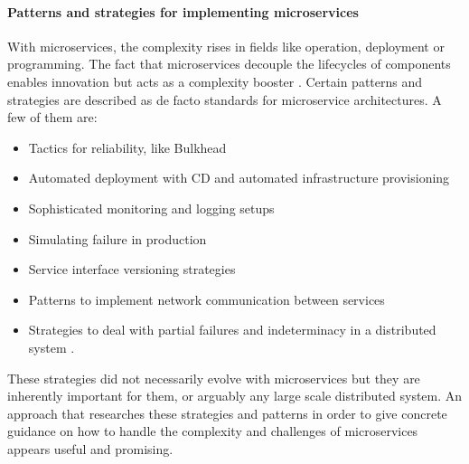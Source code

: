 \paragraph{Patterns and strategies for implementing microservices}
With microservices, the complexity rises in fields like operation, deployment or programming.
The fact that microservices decouple the lifecycles of components enables innovation but acts as a complexity booster \cite{FowlerTradeoffsDistribution2015}.
Certain patterns and strategies are described as de facto standards for microservice architectures.
A few of them are:
\begin{itemize}
\item Tactics for reliability, like Bulkhead
\item Automated deployment with \ac{CD} and automated infrastructure provisioning
\item Sophisticated monitoring and logging setups
\item Simulating failure in production
\item Service interface versioning strategies
\item Patterns to implement network communication between services
\item Strategies to deal with partial failures and indeterminacy in a distributed system \cite{Kendall1994}.
\end{itemize}
These strategies did not necessarily evolve with microservices but they are inherently important for them, or arguably any large scale distributed system.
An approach that researches these strategies and patterns in order to give concrete guidance on how to handle the complexity and challenges of microservices appears useful and promising.

